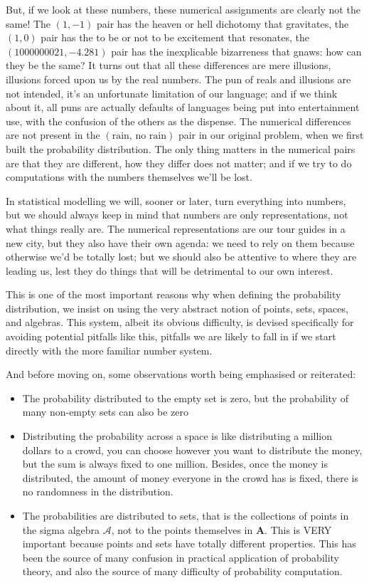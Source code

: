 \documentclass[11pt]{article}
\begin{document}
But, if we look at these numbers, these numerical assignments are clearly not the same! The \((1, -1)\) pair has the heaven or hell dichotomy that gravitates, the \((1, 0)\) pair has the to be or not to be excitement that resonates, the \((1000000021, -4.281)\) pair has the inexplicable bizarreness that gnaws: how can they be the same? It turns out that all these differences are mere illusions, illusions forced upon us by the real numbers. The pun of reals and illusions are not intended, it's an unfortunate limitation of our language; and if we think about it, all puns are actually defaults of languages being put into entertainment use, with the confusion of the others as the dispense. The numerical differences are not present in the \((\text{rain, no rain})\) pair in our original problem, when we first built the probability distribution. The only thing matters in the numerical pairs are that they are different, how they differ does not matter; and if we try to do computations with the numbers themselves we'll be lost.

In statistical modelling we will, sooner or later, turn everything into numbers, but we should always keep in mind that numbers are only representations, not what things really are. The numerical representations are our tour guides in a new city, but they also have their own agenda: we need to rely on them because otherwise we'd be totally lost; but we should also be attentive to where they are leading us, lest they do things that will be detrimental to our own interest.

This is one of the most important reasons why when defining the probability distribution, we insist on using the very abstract notion of points, sets, spaces, and algebras. This system, albeit its obvious difficulty, is devised specifically for avoiding potential pitfalls like this, pitfalls we are likely to fall in if we start directly with the more familiar number system.

And before moving on, some observations worth being emphasised or reiterated:

\begin{itemize}
\item The probability distributed to the empty set is zero, but the probability of many non-empty sets can also be zero
\item Distributing the probability across a space is like distributing a million dollars to a crowd, you can choose however you want to distribute the money, but the sum is always fixed to one million. Besides, once the money is distributed, the amount of money everyone in the crowd has is fixed, there is no randomness in the distribution.
\item The probabilities are distributed to sets, that is the collections of points in the sigma algebra \(\mathcal{A}\), not to the points themselves in \(\mathbf{A}\). This is VERY important because points and sets have totally different properties. This has been the source of many confusion in practical application of probability theory, and also the source of many difficulty of probability computation.
\end{itemize}
\end{document}
